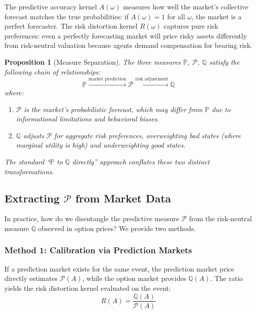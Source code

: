 \documentclass[12pt,a4paper]{article}
\newtheorem{proposition}[theorem]{Proposition}
\theoremstyle{definition}
\newcommand{\Prob}{\mathbb{P}}
\newcommand{\Q}{\mathbb{Q}}
\newcommand{\PP}{\mathcal{P}}
\begin{document}
The predictive accuracy kernel $A(\omega)$ measures how well the market's collective forecast matches the true probabilities: if $A(\omega) = 1$ for all $\omega$, the market is a perfect forecaster. The risk distortion kernel $R(\omega)$ captures pure risk preferences: even a perfectly forecasting market will price risky assets differently from risk-neutral valuation because agents demand compensation for bearing risk.

\begin{proposition}[Measure Separation]\label{prop:separation}
The three measures $\Prob$, $\PP$, $\Q$ satisfy the following chain of relationships:
\begin{equation}
    \Prob \xrightarrow{\text{market prediction}} \PP \xrightarrow{\text{risk adjustment}} \Q
\end{equation}
where:
\begin{enumerate}[label=(\roman*)]
    \item $\PP$ is the market's probabilistic forecast, which may differ from $\Prob$ due to informational limitations and behavioral biases.
    \item $\Q$ adjusts $\PP$ for aggregate risk preferences, overweighting bad states (where marginal utility is high) and underweighting good states.
\end{enumerate}
The standard ``$\Prob$ to $\Q$ directly'' approach conflates these two distinct transformations.
\end{proposition}

\subsection{Extracting $\PP$ from Market Data}

In practice, how do we disentangle the predictive measure $\PP$ from the risk-neutral measure $\Q$ observed in option prices? We provide two methods.

\subsubsection{Method 1: Calibration via Prediction Markets}

If a prediction market exists for the same event, the prediction market price directly estimates $\PP(A)$, while the option market provides $\Q(A)$. The ratio yields the risk distortion kernel evaluated on the event:
\begin{equation}
    R(A) = \frac{\Q(A)}{\PP(A)}
\end{equation}
\end{document}
